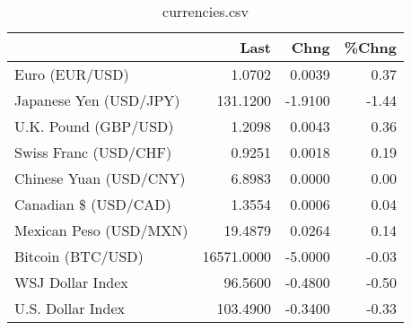 \documentclass{article}%
\begin{document}
%


\begin{table}[htbp]%
\caption{currencies.csv}%
\centering%
\begin{adjustbox}{width=1\textwidth}%
\begin{tabular}{lrrr}
\toprule
                       &       Last &    Chng &  \%Chng \\
\midrule
        Euro (EUR/USD) &     1.0702 &  0.0039 &   0.37 \\
Japanese Yen (USD/JPY) &   131.1200 & -1.9100 &  -1.44 \\
  U.K. Pound (GBP/USD) &     1.2098 &  0.0043 &   0.36 \\
 Swiss Franc (USD/CHF) &     0.9251 &  0.0018 &   0.19 \\
Chinese Yuan (USD/CNY) &     6.8983 &  0.0000 &   0.00 \\
  Canadian \$ (USD/CAD) &     1.3554 &  0.0006 &   0.04 \\
Mexican Peso (USD/MXN) &    19.4879 &  0.0264 &   0.14 \\
     Bitcoin (BTC/USD) & 16571.0000 & -5.0000 &  -0.03 \\
      WSJ Dollar Index &    96.5600 & -0.4800 &  -0.50 \\
     U.S. Dollar Index &   103.4900 & -0.3400 &  -0.33 \\
\bottomrule
\end{tabular}
%
\end{adjustbox}%
\end{table}

%
\end{document}
